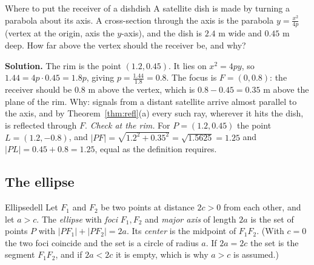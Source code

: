 \documentclass[11pt]{article}
\begin{document}
\begin{exmp}{Where to put the receiver of a dish}{dish}
A satellite dish is made by turning a parabola about its axis. A cross-section through the axis is the parabola $y=\frac{x^2}{4p}$ (vertex at the origin, axis the $y$-axis), and the dish is $2.4$ m wide and $0.45$ m deep. How far above the vertex should the receiver be, and why?

\textbf{Solution.} The rim is the point $(1.2,0.45)$. It lies on $x^2=4py$, so $1.44=4p\cdot0.45=1.8p$, giving $p=\frac{1.44}{1.8}=0.8$. The focus is $F=(0,0.8)$: the receiver should be $0.8$ m above the vertex, which is $0.8-0.45=0.35$ m above the plane of the rim. Why: signals from a distant satellite arrive almost parallel to the axis, and by Theorem~\ref{thm:refl}(a) every such ray, wherever it hits the dish, is reflected through $F$. \emph{Check at the rim.} For $P=(1.2,0.45)$ the point $L=(1.2,-0.8)$, and $\lvert PF\rvert=\sqrt{1.2^2+0.35^2}=\sqrt{1.5625}=1.25$ and $\lvert PL\rvert=0.45+0.8=1.25$, equal as the definition requires.
\end{exmp}

\subsection*{The ellipse}

\begin{defn}{Ellipse}{dell}
Let $F_1$ and $F_2$ be two points at distance $2c>0$ from each other, and let $a>c$. The \emph{ellipse} with \emph{foci} $F_1,F_2$ and \emph{major axis} of length $2a$ is the set of points $P$ with $\lvert PF_1\rvert+\lvert PF_2\rvert=2a$. Its \emph{center} is the midpoint of $F_1F_2$. (With $c=0$ the two foci coincide and the set is a circle of radius $a$. If $2a=2c$ the set is the segment $F_1F_2$, and if $2a<2c$ it is empty, which is why $a>c$ is assumed.)
\end{defn}
\end{document}

